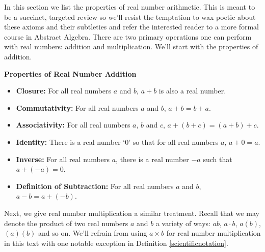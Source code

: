 \documentclass{ximera}
\begin{document}
	\author{Stitz-Zeager}




\setcounter{footnote}{0}

\label{AppRealNumberArithmetic}


In this section we list the properties of real number arithmetic.  This is meant to be a succinct, targeted review so we'll resist the temptation to wax poetic about these axioms and their subtleties and refer the interested reader to a more formal course in Abstract Algebra.  There are two primary operations one can perform with real numbers:  addition and multiplication.  We'll start with the properties of addition.

\medskip

\label{realnumberaddition}


\centerline{\textbf{Properties of Real Number Addition}}

\begin{itemize}

\item  \textbf{Closure:}  For all real numbers $a$ and $b$,  $a+b$ is also a real number.

\item  \textbf{Commutativity:}  For all real numbers $a$ and $b$, $a+b = b+a$.

\item  \textbf{Associativity:}  For all real numbers $a$, $b$ and $c$, $a+(b+c) = (a+b)+c$.

\item  \textbf{Identity:}  There is a real number `$0$' so that for all real numbers $a$, $a+0 = a$.

\item  \textbf{Inverse:}  For all real numbers $a$, there is a real number $-a$ such that $a + (-a) = 0$.

\item \textbf{Definition of Subtraction:}  For all real numbers $a$ and $b$, $a - b = a + (-b)$.

\end{itemize}


\medskip

Next, we give real number multiplication a similar treatment.  Recall that we may denote the product of two real numbers $a$ and $b$ a variety of ways:  $ab$, $a \cdot b$, $a(b)$, $(a)(b)$ and so on.  We'll refrain from using $a \times b$ for real number multiplication in this text with one notable exception in Definition \ref{scientificnotation}.
\end{document}
